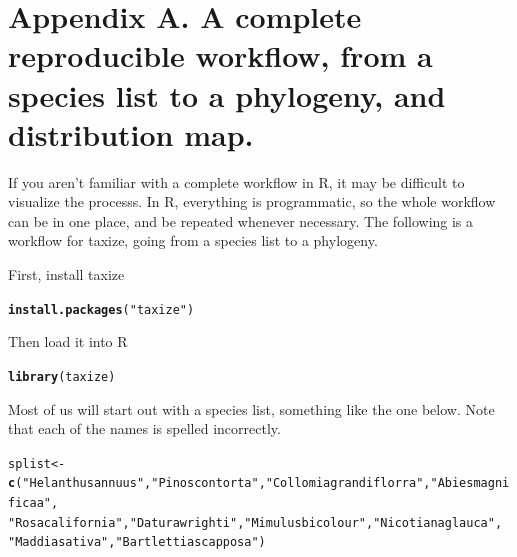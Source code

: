 \documentclass[letterpaper,superscriptaddress,showkeys,longbibliography,10pt]{revtex4-1}\usepackage{graphicx, color}
\makeatletter
\newcommand{\hlfunctioncall}[1]{\textcolor[rgb]{0.501960784313725,0,0.329411764705882}{\textbf{#1}}}%
\newcommand{\hlstring}[1]{\textcolor[rgb]{0.6,0.6,1}{#1}}%
\newenvironment{kframe}{%
 \def\at@end@of@kframe{}%
 \ifinner\ifhmode%
  \def\at@end@of@kframe{\end{minipage}}%
  \begin{minipage}{\columnwidth}%
 \fi\fi%
 \def\FrameCommand##1{\hskip\@totalleftmargin \hskip-\fboxsep
 \colorbox{shadecolor}{##1}\hskip-\fboxsep
     \hskip-\linewidth \hskip-\@totalleftmargin \hskip\columnwidth}%
 \MakeFramed {\advance\hsize-\width
   \@totalleftmargin\z@ \linewidth\hsize
   \@setminipage}}%
 {\par\unskip\endMakeFramed%
 \at@end@of@kframe}
\newenvironment{knitrout}{}{} %
\makeatother
\begin{document}
\section{Appendix A. A complete reproducible workflow, from a species list to a phylogeny, and distribution map.}

If you aren't familiar with a complete workflow in R, it may be difficult to visualize the processs. In R, everything is programmatic, so the whole workflow can be in one place, and be repeated whenever necessary. The following is a workflow for taxize, going from a species list to a phylogeny. 

First, install taxize

\begin{knitrout}
\color{fgcolor}\begin{kframe}
\begin{alltt}
\hlfunctioncall{install.packages}(\hlstring{"taxize"})
\end{alltt}
\end{kframe}
\end{knitrout}


Then load it into R

\begin{knitrout}
\color{fgcolor}\begin{kframe}
\begin{alltt}
\hlfunctioncall{library}(taxize)
\end{alltt}
\end{kframe}
\end{knitrout}


Most of us will start out with a species list, something like the one below. Note that each of the names is spelled incorrectly.

\begin{knitrout}
\color{fgcolor}\begin{kframe}
\begin{alltt}
splist <- \hlfunctioncall{c}(\hlstring{"Helanthus annuus"}, \hlstring{"Pinos contorta"}, \hlstring{"Collomia grandiflorra"}, \hlstring{"Abies magnificaa"}, 
    \hlstring{"Rosa california"}, \hlstring{"Datura wrighti"}, \hlstring{"Mimulus bicolour"}, \hlstring{"Nicotiana glauca"}, 
    \hlstring{"Maddia sativa"}, \hlstring{"Bartlettia scapposa"})
\end{alltt}
\end{kframe}
\end{knitrout}
\end{document}
